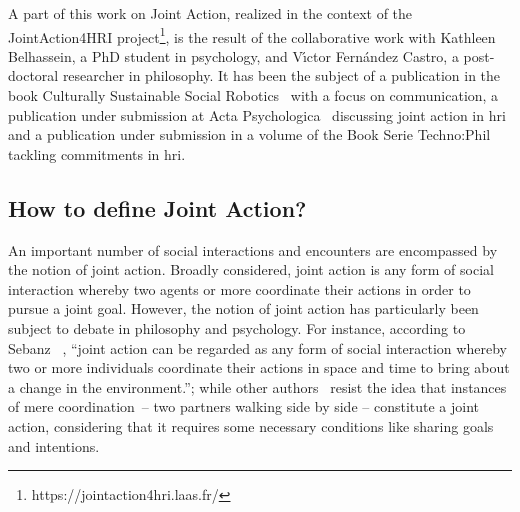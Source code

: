 \documentclass[a4paper,11pt,twoside]{StyleThese}
\begin{document}
A part of this work on Joint Action, realized in the context of the JointAction4HRI project\footnote{https://jointaction4hri.laas.fr/}, is the result of the collaborative work with Kathleen Belhassein, a PhD student in psychology, and V{\'\i}ctor Fern{\'a}ndez Castro, a post-doctoral researcher in philosophy. It has been the subject of a publication in the book Culturally Sustainable Social Robotics~\cite{belhassein_2020_horizontal} with a focus on communication, a publication under submission at Acta Psychologica~\cite{belhassein_2021_adressing} discussing joint action in \acrshort{hri} and a publication under submission in a volume of the Book Serie Techno:Phil~\cite{castro_2021_adressing} tackling commitments in \acrshort{hri}.

\subsection{How to define Joint Action?}\label{chap1:subsec:def_ja}

An important number of social interactions and encounters are encompassed by the notion of joint action. Broadly considered, joint action is any form of social interaction whereby two agents or more coordinate their actions in order to pursue a joint goal. However, the notion of joint action has particularly been subject to debate in philosophy and psychology. For instance, according to Sebanz \etal~\cite[p.~70]{sebanz_2006_joint}, ``joint action can be regarded as
any form of social interaction whereby two or more individuals coordinate their actions in space and time to bring about a change in the environment.''; while other authors~\cite{carpenter_2009_just, cohen_1991_teamwork, fiebich_2013_joint, tomasello_2005_understanding,pacherie_2012_agency} resist the idea that instances of mere coordination – \eg two partners walking side by side – constitute a joint action, considering that it requires some necessary conditions like sharing goals and intentions.
\end{document}
